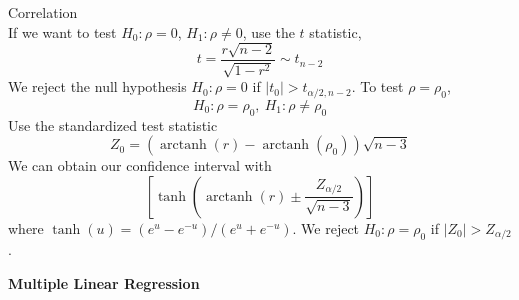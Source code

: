 \documentclass{article}
\DeclareMathOperator{\atanh}{arctanh}
\begin{document}
\begin{multicols*}{3}
\begin{blackbox}{Correlation}
\[        \]
        If we want to test $H_0: \rho = 0$, $H_1: \rho \neq 0$, use the $t$ statistic,\\[-3ex]
        \[t = \frac{r\sqrt{n-2}}{\sqrt{1-r^2}} \sim t_{n-2}\]
        We reject the null hypothesis $H_0: \rho = 0$ if $|t_0| > t_{\alpha/2, n-2}$. To test $\rho = \rho_0$, \\[-2ex]
        \[H_0: \rho = \rho_0, \ H_1: \rho \neq \rho_0\]
        Use the standardized test statistic\\[-2.3ex]
        \[Z_0 = (\atanh(r) - \atanh(\rho_0))\sqrt{n-3}\]
        We can obtain our confidence interval with 
        \[\left[\tanh\left(\atanh(r) \pm \frac{Z_{\alpha/2}}{\sqrt{n-3}}\right)\right]\]
        where $\tanh(u) = (e^u-e^{-u})/(e^u + e^{-u})$. We reject $H_0: \rho = \rho_0$ if $|Z_0| > Z_{\alpha/2}$.
    \end{blackbox}

\end{multicols*}

\begin{center}{\large{\textbf{Multiple Linear Regression}}}\\
\end{center}
\end{document}
